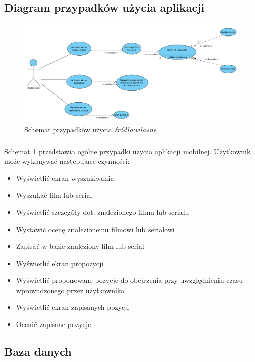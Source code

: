\documentclass[12pt,oneside,a4paper]{report}
\begin{document}
\subsection{Diagram przypadków użycia aplikacji}
\begin{figure}[ht!]
	\centering
	\includegraphics[width=17cm]{useCase'y}
	\caption{Schemat przypadków użycia 
		\textit{źródło:własne }}
	\label{useCase'y}
\end{figure}
\subparagraph{}Schemat \ref{useCase'y} przedstawia ogólne przypadki użycia aplikacji mobilnej. Użytkownik może wykonywać nastepujące czynności:
\begin{itemize}
	\item Wyświetlić ekran wyszukiwania
	\item Wyszukać film lub serial
	\item Wyświetlić szczegóły dot. znalezionego filmu lub serialu
	\item Wystawić ocenę znalezionemu filmowi lub serialowi
	\item Zapisać w bazie znaleziony film lub serial
	\item Wyświetlić ekran propozycji
	\item Wyświetlić proponowane pozycje do obejrzenia przy uwzględnieniu czasu wprowadzonego przez użytkownika
	\item Wyświetlić ekran zapisanych pozycji
	\item Ocenić zapisane pozycje
\end{itemize}
\subsection{Baza danych}
\end{document}

